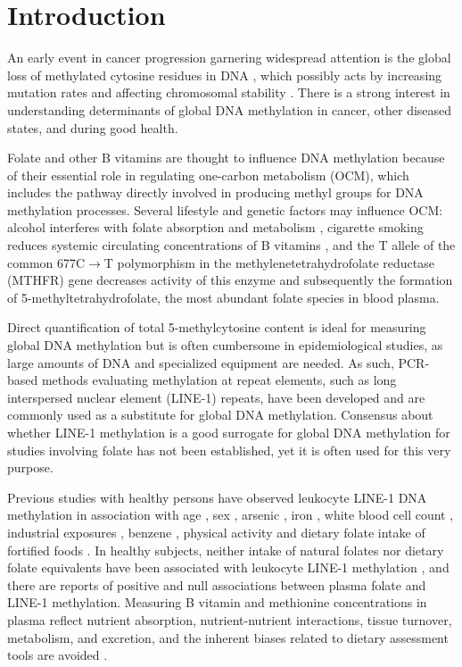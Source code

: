 \newpage

\section[]{Introduction} %
\noindent An early event in cancer progression garnering widespread attention is the global loss of methylated cytosine residues in DNA \cite{c31,c32}, which possibly acts by increasing mutation rates and affecting chromosomal stability \cite{c33,c34}. There is a strong interest in understanding determinants of global DNA methylation in cancer, other diseased states, and during good health.

\noindent Folate and other B vitamins are thought to influence DNA methylation because of their essential role in regulating one-carbon metabolism (OCM), which includes the pathway directly involved in producing methyl groups for DNA methylation processes. Several lifestyle and genetic factors may influence OCM: alcohol interferes with folate absorption and metabolism \cite{c35}, cigarette smoking reduces systemic circulating concentrations of B vitamins \cite{c36}, and the T allele of the common 677C$\rightarrow$T polymorphism in the methylenetetrahydrofolate reductase (MTHFR) gene decreases activity of this enzyme and subsequently the formation of 5-methyltetrahydrofolate, the most abundant folate species in blood plasma.

\noindent Direct quantification of total 5-methylcytosine content is ideal for measuring global DNA methylation but is often cumbersome in epidemiological studies, as large amounts of DNA and specialized equipment are needed. As such, PCR-based methods evaluating methylation at repeat elements, such as long interspersed nuclear element (LINE-1) repeats, have been developed and are commonly used as a substitute for global DNA methylation. Consensus about whether LINE-1 methylation is a good surrogate for global DNA methylation for studies involving folate has not been established, yet it is often used for this very purpose.

\noindent Previous studies with healthy persons have observed leukocyte LINE-1 DNA methylation in association with age \cite{c37,c38,c39}, sex \cite{c310,c313}, arsenic \cite{c311}, iron \cite{c311}, white blood cell count \cite{c310}, industrial exposures \cite{c314}, benzene \cite{c315}, physical activity \cite{c316} and dietary folate intake of fortified foods \cite{c317}. In healthy subjects, neither intake of natural folates nor dietary folate equivalents have been associated with leukocyte LINE-1 methylation \cite{c317}, and there are reports of positive \cite{c318} and null associations \cite{c319} between plasma folate and LINE-1 methylation. Measuring B vitamin and methionine concentrations in plasma reflect nutrient absorption, nutrient-nutrient interactions, tissue turnover, metabolism, and excretion, and the inherent biases related to dietary assessment tools are avoided \cite{c320}.

